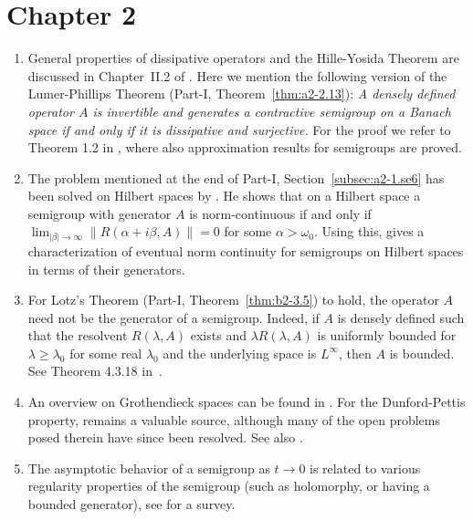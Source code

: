 \begin{enumerate}
\end{enumerate}
\section*{Chapter 2}
\begin{enumerate} 
\item
General properties of dissipative operators and the Hille-Yosida Theorem are discussed in Chapter~II.2 of \textcite{zbmath01354832}. 
Here we mention the following version of the Lumer-Phillips Theorem (Part-I, Theorem~\ref{thm:a2-2.13}):  
\textit{A densely defined operator $A$ is invertible and generates a contractive semigroup on a Banach space if and only if it is dissipative and surjective.} 
For the proof we refer to Theorem 1.2 in \textcite{zbmath07950102}, where also approximation results for semigroups are proved.

\item 
The problem mentioned at the end of Part-I, Section~\ref{subsec:a2-1.se6} has been solved on Hilbert spaces by \textcite{zbmath00126068}. 
He shows that on a Hilbert space a semigroup with generator  $A$ is norm-continuous if and only if
$\lim_{\lvert \beta \rvert \to \infty} \lVert R(\alpha + i \beta, A ) \rVert = 0$  for some $\alpha > \omega_0$.
Using this, \textcite{zbmath00701021} gives a characterization of eventual norm continuity for semigroups on Hilbert spaces in terms of their generators.

\item
For Lotz's Theorem (Part-I, Theorem~\ref{thm:b2-3.5}) to hold, the operator $A$ need not be the generator of a semigroup. 
Indeed, if $A$ is densely defined such that the resolvent $R(\lambda,A)$ exists and $\lambda R(\lambda,A)$ is uniformly bounded for $\lambda \geq \lambda_0$ for some real $\lambda_0$ and the underlying space is $L^\infty$, then  $A$ is bounded. See Theorem 4.3.18 in~\textcite{zbmath05842872}.

\item
An overview on Grothendieck spaces can be found in \textcite{zbmath07458830}.
For the Dunford-Pettis property,  \textcite{zbmath03911038} remains a valuable source, although many of the open problems posed therein have since been resolved. 
See also \textcite{zbmath00769497}.

\item 
The asymptotic behavior of a semigroup as 
$t \rightarrow 0$ is related to various regularity properties of the semigroup (such as holomorphy, or having a bounded generator), see \textcite{zbmath06571398}  for a survey.

\end{enumerate}
